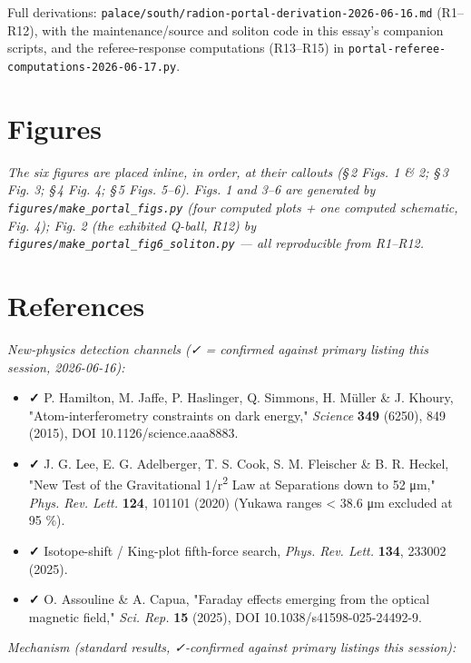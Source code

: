 \documentclass[11pt]{article}
\begin{document}
Full derivations: \texttt{palace/south/radion-portal-derivation-2026-06-16.md} (R1--R12), with the maintenance/source and soliton code in this essay's companion scripts, and the referee-response computations (R13--R15) in \texttt{portal-referee-computations-2026-06-17.py}.

\section*{Figures}
\emph{The six figures are placed inline, in order, at their callouts (\S\,2 Figs. 1 \& 2; \S\,3 Fig. 3; \S\,4 Fig. 4; \S\,5 Figs. 5--6). Figs. 1 and 3--6 are generated by \texttt{figures/make\_portal\_figs.py} (four computed plots + one computed schematic, Fig. 4); Fig. 2 (the exhibited Q-ball, R12) by \texttt{figures/make\_portal\_fig6\_soliton.py} --- all reproducible from R1--R12.}

\section*{References}
\emph{New-physics detection channels (✓ = confirmed against primary listing this session, 2026-06-16):}

\begin{itemize}
\item \textbf{✓} P. Hamilton, M. Jaffe, P. Haslinger, Q. Simmons, H. Müller \& J. Khoury, "Atom-interferometry constraints on dark energy," \emph{Science} \textbf{349} (6250), 849 (2015), DOI 10.1126/science.aaa8883.
\item \textbf{✓} J. G. Lee, E. G. Adelberger, T. S. Cook, S. M. Fleischer \& B. R. Heckel, "New Test of the Gravitational 1/r\textsuperscript{2} Law at Separations down to 52 μm," \emph{Phys. Rev. Lett.} \textbf{124}, 101101 (2020) (Yukawa ranges < 38.6 μm excluded at 95 \%).
\item \textbf{✓} Isotope-shift / King-plot fifth-force search, \emph{Phys. Rev. Lett.} \textbf{134}, 233002 (2025).
\item \textbf{✓} O. Assouline \& A. Capua, "Faraday effects emerging from the optical magnetic field," \emph{Sci. Rep.} \textbf{15} (2025), DOI 10.1038/s41598-025-24492-9.
\end{itemize}

\emph{Mechanism (standard results, ✓-confirmed against primary listings this session):}
\end{document}
